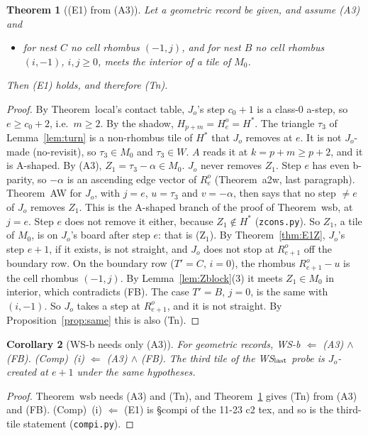 \documentclass[11pt]{article}
\newtheorem{theorem}{Theorem}\newtheorem{lemma}[theorem]{Lemma}\newtheorem{proposition}[theorem]{Proposition}
\newtheorem{corollary}[theorem]{Corollary}
\theoremstyle{definition}\newtheorem{definition}[theorem]{Definition}\newtheorem{remark}[theorem]{Remark}
\begin{document}
\begin{theorem}[(E1) from (A3)]\label{thm:E1A3}
Let a geometric record be given, and assume (A3) and
\begin{itemize}
\item[\textbf{(FB)}] for nest $C$ no cell rhombus $(-1,j)$, and for nest $B$ no cell rhombus $(i,-1)$, $i,j\ge0$, meets the interior of a tile of $M_0$.
\end{itemize}
Then (E1) holds, and therefore (Tn).
\end{theorem}
\begin{proof}
By Theorem~local's contact table, $J_o$'s step $c_0+1$ is a class-0 a-step, so $e\ge c_0+2$, i.e.\ $m\ge2$. By the shadow, $H_{p+m}=H^o_e=H^\ast$. The triangle $\tau_3$ of Lemma~\ref{lem:turn} is a non-rhombus tile of $H^\ast$ that $J_o$ removes at $e$. It is not $J_o$-made (no-revisit), so $\tau_3\in M_0$ and $\tau_3\in W$. $A$ reads it at $k=p+m\ge p+2$, and it is A-shaped. By (A3), $Z_1=\tau_3-\alpha\in M_0$.
$J_o$ never removes $Z_1$. Step $e$ has even b-parity, so $-\alpha$ is an ascending edge vector of $R^o_e$ (Theorem~a2w, last paragraph). Theorem~AW for $J_o$, with $j=e$, $u=\tau_3$ and $v=-\alpha$, then says that no step $\ne e$ of $J_o$ removes $Z_1$. This is the A-shaped branch of the proof of Theorem~wsb, at $j=e$. Step $e$ does not remove it either, because $Z_1\notin H^\ast$ (\texttt{zcons.py}). So $Z_1$, a tile of $M_0$, is on $J_o$'s board after step $e$: that is (Z$_1$).
By Theorem~\ref{thm:E1Z}, $J_o$'s step $e+1$, if it exists, is not straight, and $J_o$ does not stop at $R^o_{e+1}$ off the boundary row. On the boundary row ($T'=C$, $i=0$), the rhombus $R^o_{e+1}-u$ is the cell rhombus $(-1,j)$. By Lemma~\ref{lem:Zblock}(3) it meets $Z_1\in M_0$ in interior, which contradicts (FB). The case $T'=B$, $j=0$, is the same with $(i,-1)$. So $J_o$ takes a step at $R^o_{e+1}$, and it is not straight. By Proposition~\ref{prop:same} this is also (Tn).
\end{proof}

\begin{corollary}[WS-b needs only (A3)]\label{cor:wsb}
For geometric records, WS-b $\Leftarrow$ (A3) $\wedge$ (FB). (Comp)~(i) $\Leftarrow$ (A3) $\wedge$ (FB). The third tile of the WS$_{\rm last}$ probe is $J_o$-created at $e+1$ under the same hypotheses.
\end{corollary}
\begin{proof}
Theorem~wsb needs (A3) and (Tn), and Theorem~\ref{thm:E1A3} gives (Tn) from (A3) and (FB). (Comp)~(i) $\Leftarrow$ (E1) is \S compi of the 11-23 c2 tex, and so is the third-tile statement (\texttt{compi.py}).
\end{proof}
\end{document}
